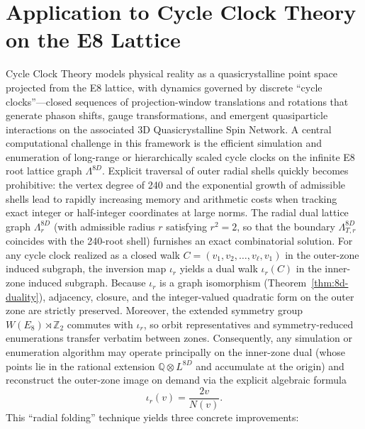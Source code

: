 \documentclass{article}
\begin{document}
\section{Application to Cycle Clock Theory on the E8 Lattice}
Cycle Clock Theory models physical reality as a quasicrystalline point space projected from the E8 lattice, with dynamics governed by discrete ``cycle clocks''---closed sequences of projection-window translations and rotations that generate phason shifts, gauge transformations, and emergent quasiparticle interactions on the associated 3D Quasicrystalline Spin Network.
A central computational challenge in this framework is the efficient simulation and enumeration of long-range or hierarchically scaled cycle clocks on the infinite E8 root lattice graph \(\Lambda^{8D}\). Explicit traversal of outer radial shells quickly becomes prohibitive: the vertex degree of 240 and the exponential growth of admissible shells lead to rapidly increasing memory and arithmetic costs when tracking exact integer or half-integer coordinates at large norms.
The radial dual lattice graph \(\Lambda_r^{8D}\) (with admissible radius \(r\) satisfying \(r^2 = 2\), so that the boundary \(\Lambda_{T,r}^{8D}\) coincides with the 240-root shell) furnishes an exact combinatorial solution. For any cycle clock realized as a closed walk \(C = (v_1, v_2, \dots, v_\ell, v_1)\) in the outer-zone induced subgraph, the inversion map \(\iota_r\) yields a dual walk \(\iota_r(C)\) in the inner-zone induced subgraph. Because \(\iota_r\) is a graph isomorphism (Theorem~\ref{thm:8d-duality}), adjacency, closure, and the integer-valued quadratic form on the outer zone are strictly preserved. Moreover, the extended symmetry group \(W(E_8) \rtimes \mathbb{Z}_2\) commutes with \(\iota_r\), so orbit representatives and symmetry-reduced enumerations transfer verbatim between zones.
Consequently, any simulation or enumeration algorithm may operate principally on the inner-zone dual (whose points lie in the rational extension \(\mathbb{Q} \otimes L^{8D}\) and accumulate at the origin) and reconstruct the outer-zone image on demand via the explicit algebraic formula
\[
\iota_r(v) = \frac{2 v}{N(v)}.
\]
This ``radial folding'' technique yields three concrete improvements:
\end{document}
